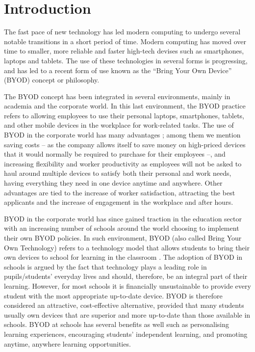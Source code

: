 \documentclass[a4paper,10pt,twocolumn,preprint,3p]{elsarticle}
\begin{document}
\section{Introduction}
\label{sec:intro}
The fast pace of new technology has led modern computing to undergo
several notable transitions in a short period of time. Modern computing has moved
over time to smaller, more reliable and faster high-tech devises such
as smartphones, laptops and tablets. The use of these technologies in
several forms is progressing, and has led to a recent form of use known as
the ``Bring Your Own Device'' (BYOD) concept or philosophy. 

The BYOD concept has been integrated in several environments, mainly in
academia and the corporate world. In this last environment, the BYOD
practice refers to allowing employees to use their
personal laptops, smartphones, tablets, and other mobile devices in
the workplace for work-related tasks. The use of BYOD in the corporate world has many
advantages \cite{singh2012byod}; among them we mention saving costs --
as the company allows itself to save money on high-priced devices that
it would normally be required to purchase for their employees --, and
increasing flexibility and worker productivity as employees will not
be asked to haul around multiple devices to satisfy both their personal and
work needs, having everything they need in one device anytime and
anywhere.  
Other advantages are tied to the increase of worker satisfaction,  attracting the best applicants and the increase of engagement in the workplace and after hours.

BYOD in the corporate world has since gained traction in the education
sector with an increasing number of schools around the world choosing
to implement their own BYOD policies. In such environment, BYOD (also
called Bring Your Own Technology) refers to a technology model that
allows students to bring their own devices to school for learning in
the classroom \cite{sangani2013byod, song2014bring}. The adoption of BYOD in schools
is argued by the fact that technology plays a leading role in
pupils/students' everyday lives and should, therefore, be an integral
part of their learning. However, for most schools it is financially
unsustainable to provide every student with the most appropriate
up-to-date device. BYOD is therefore considered an attractive,
cost-effective alternative, provided that many students usually own
devices that are superior and more up-to-date than those available in
schools. BYOD at schools has several benefits as well such as
personalising learning experiences, encouraging students' independent
learning, and promoting anytime, anywhere learning opportunities. 
\end{document}
